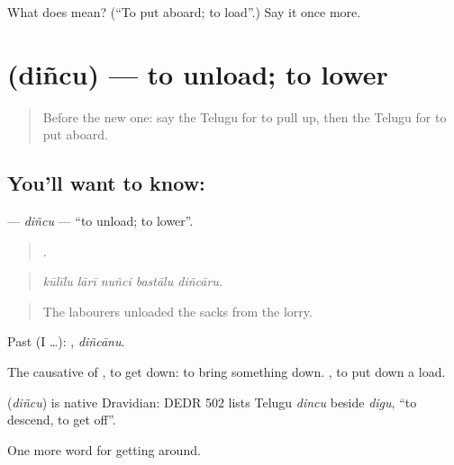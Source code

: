\begin{tcolorbox}[breakable,colback=teal!4,colframe=teal!35!black,title={Before you move on}]
What does  mean? (\textquotedblleft{}To put aboard; to load\textquotedblright{}.) Say it once more.
\end{tcolorbox}
\section[\texorpdfstring{\te{దించు} (diñcu)}{దించు (diñcu)}]{ (diñcu) — to unload; to lower}

\label{lesson:TE-C450-dincu}



\begin{quote}
Before the new one: say the Telugu for to pull up, then the Telugu for to put aboard.
\end{quote}

\subsection*{You'll want to know: }
\textbf{} — \emph{diñcu} — \textquotedblleft{}to unload; to lower\textquotedblright{}.

\begin{quote}
    .
\end{quote}

\begin{quote}
\emph{kūlīlu lārī nuñci bastālu diñcāru.}
\end{quote}

\begin{quote}
The labourers unloaded the sacks from the lorry.
\end{quote}

Past (I …): , \emph{diñcānu}.

The causative of , to get down: to bring something down.  , to put down a load.

\begin{cousinweb}
\textbf{} (\emph{diñcu}) is native Dravidian: DEDR 502 lists Telugu \emph{dincu} beside \emph{digu}, \textquotedblleft{}to descend, to get off\textquotedblright{}.
\end{cousinweb}

\begin{grammarlens}[title={What you've built}]
One more word for getting around.
\end{grammarlens}

